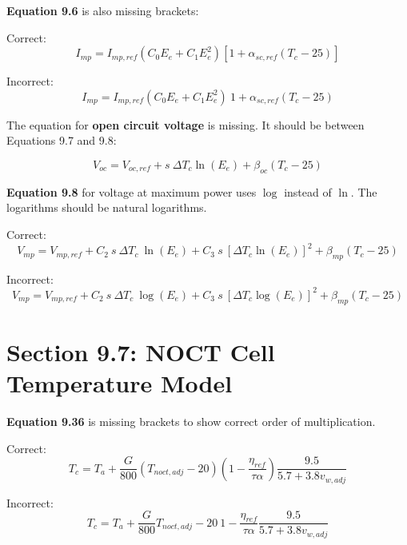 \documentclass[report]{nrel}
\begin{document}
\textbf{Equation 9.6} is also missing brackets:

Correct:
\begin{equation*}
I_{mp} = I_{mp,ref} (C_0 E_e + C_1 E_e^2) \left[1 + \alpha_{sc,ref} (T_c - 25)\right]
\end{equation*}

Incorrect:
\begin{equation*}
I_{mp} = I_{mp,ref} (C_0 E_e + C_1 E_e^2)~1 + \alpha_{sc,ref} (T_c - 25)
\end{equation*}

The equation for \textbf{open circuit voltage} is missing. It should be between Equations 9.7 and 9.8:

\begin{equation*}
V_{oc} = V_{oc,ref}+ s~\Delta T_c \ln(E_e)+ \beta_{oc} (T_c - 25)
\end{equation*}

\textbf{Equation 9.8} for voltage at maximum power uses $\log$ instead of $\ln$. The logarithms  should be natural logarithms.

Correct:
\begin{equation*}
V_{mp} = V_{mp,ref} +
 C_2~s~\Delta T_c~\ln(E_e) +
 C_3~s~\left[\Delta T_c \ln(E_e)\right]^2 +
 \beta_{mp} (T_c - 25)
\end{equation*}

Incorrect:
\begin{equation*}
V_{mp} = V_{mp,ref} +
 C_2~s~\Delta T_c~\log(E_e) +
 C_3~s~\left[\Delta T_c \log(E_e)\right]^2 +
 \beta_{mp} (T_c - 25)
\end{equation*}

\section*{Section 9.7: NOCT Cell Temperature Model}

\textbf{Equation 9.36} is missing brackets to show correct order of multiplication.

Correct:
\begin{equation*}
T_c = T_a + \frac{G}{800} \left(T_{noct,adj} - 20 \right) \left(1-\frac{\eta_{ref}}{\tau \alpha}\right) \frac{9.5}{5.7+3.8v_{w,adj}}
\end{equation*}

Incorrect:
\begin{equation*}
T_c = T_a + \frac{G}{800} T_{noct,adj} - 20~ 1-\frac{\eta_{ref}}{\tau \alpha} \frac{9.5}{5.7+3.8v_{w,adj}}
\end{equation*}
\end{document}
